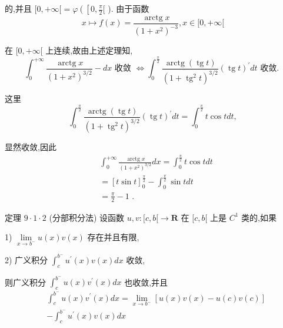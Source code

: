 的,并且 $\lbrack 0, + \infty \lbrack  = \varphi \left( \left\lbrack  {0,\frac{\pi }{2}\lbrack }\right. \right.$ ). 由于函数
$$x \mapsto  f\left( x\right)  = \frac{\operatorname{arctg}x}{{\left( 1 + {x}^{2}\right) }^{-3}},x \in  \lbrack 0, + \infty \lbrack$$

在 $\lbrack 0, + \infty \lbrack$ 上连续,故由上述定理知,
$${\int }_{0}^{+\infty }\frac{\operatorname{arctg}x}{{\left( 1 + {x}^{2}\right) }^{3/2}} - {dx}\text{ 收敛 } \Leftrightarrow  {\int }_{0}^{\frac{\pi }{2}}\frac{\operatorname{arctg}\left( {\operatorname{tg}t}\right) }{{\left( 1 + {\operatorname{tg}}^{2}t\right) }^{3/2}}{\left( \operatorname{tg}t\right) }^{\prime }{dt}\text{ 收敛. }$$

这里
$${\int }_{0}^{\frac{\pi }{2}}\frac{\operatorname{arctg}\left( {\operatorname{tg}t}\right) }{{\left( 1 + {\operatorname{tg}}^{2}t\right) }^{3/2}}{\left( \operatorname{tg}t\right) }^{\prime }{dt} = {\int }_{0}^{\frac{\pi }{2}}t\cos {tdt},$$

显然收敛,因此
\begin{align*}
	&{\int }_{0}^{+\infty }\frac{\operatorname{arctg}x}{{\left( 1 + {x}^{2}\right) }^{3/2}}{dx} = {\int }_{0}^{\frac{\pi }{2}}t\cos {tdt}\\
	&= {\left\lbrack  t\sin t\right\rbrack  }_{0}^{\frac{\pi }{2}} - {\int }_{0}^{\frac{\pi }{2}}\sin {tdt}\\
	&= \frac{\pi }{2} - 1\text{ . }
\end{align*}

定理 $9 \cdot  1 \cdot  2$ (分部积分法) 设函数 $u,v : \lbrack c,b\lbrack  \rightarrow  \mathbf{R}$ 在 $\lbrack c,b\lbrack$ 上是 ${C}^{1}$ 类的,如果

1) $\mathop{\lim }\limits_{{x \rightarrow  {b}^{ - }}}u\left( x\right) v\left( x\right)$ 存在并且有限,

2) 广义积分 ${\int }_{c}^{{b}^{ - }}{u}^{\prime }\left( x\right) v\left( x\right) {dx}$ 收敛,

则广义积分 ${\int }_{c}^{{b}^{ - }}u\left( x\right) {v}^{\prime }\left( x\right) {dx}$ 也收敛,并且
\begin{align*}
	&{\int }_{c}^{{b}^{ - }}u\left( x\right) {v}^{\prime }\left( x\right) {dx} = \mathop{\lim }\limits_{{x \rightarrow  {b}^{ - }}}\left\lbrack  {u\left( x\right) v\left( x\right)  - u\left( c\right) v\left( c\right) }\right\rbrack\\
	&- {\int }_{c}^{{b}^{ - }}{u}^{\prime }\left( x\right) v\left( x\right) {dx}
\end{align*}

